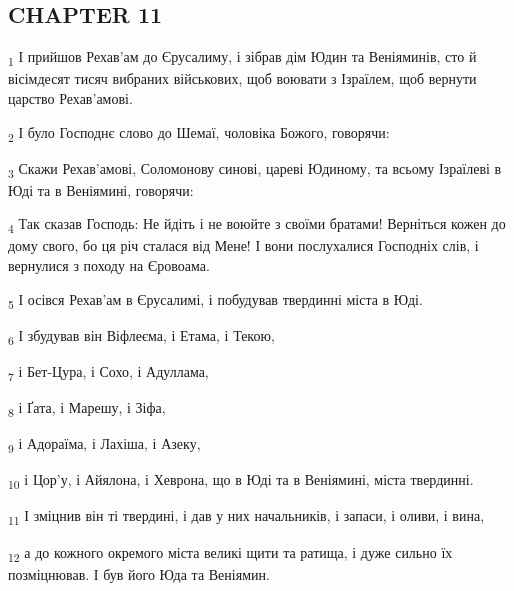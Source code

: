 \subsection{CHAPTER 11}
\begin{tcolorbox}
\textsubscript{1} І прийшов Рехав'ам до Єрусалиму, і зібрав дім Юдин та Веніяминів, сто й вісімдесят тисяч вибраних військових, щоб воювати з Ізраїлем, щоб вернути царство Рехав'амові.
\end{tcolorbox}
\begin{tcolorbox}
\textsubscript{2} І було Господнє слово до Шемаї, чоловіка Божого, говорячи:
\end{tcolorbox}
\begin{tcolorbox}
\textsubscript{3} Скажи Рехав'амові, Соломонову синові, цареві Юдиному, та всьому Ізраїлеві в Юді та в Веніямині, говорячи:
\end{tcolorbox}
\begin{tcolorbox}
\textsubscript{4} Так сказав Господь: Не йдіть і не воюйте з своїми братами! Верніться кожен до дому свого, бо ця річ сталася від Мене! І вони послухалися Господніх слів, і вернулися з походу на Єровоама.
\end{tcolorbox}
\begin{tcolorbox}
\textsubscript{5} І осівся Рехав'ам в Єрусалимі, і побудував твердинні міста в Юді.
\end{tcolorbox}
\begin{tcolorbox}
\textsubscript{6} І збудував він Віфлеєма, і Етама, і Текою,
\end{tcolorbox}
\begin{tcolorbox}
\textsubscript{7} і Бет-Цура, і Сохо, і Адуллама,
\end{tcolorbox}
\begin{tcolorbox}
\textsubscript{8} і Ґата, і Марешу, і Зіфа,
\end{tcolorbox}
\begin{tcolorbox}
\textsubscript{9} і Адораїма, і Лахіша, і Азеку,
\end{tcolorbox}
\begin{tcolorbox}
\textsubscript{10} і Цор'у, і Айялона, і Хеврона, що в Юді та в Веніямині, міста твердинні.
\end{tcolorbox}
\begin{tcolorbox}
\textsubscript{11} І зміцнив він ті твердині, і дав у них начальників, і запаси, і оливи, і вина,
\end{tcolorbox}
\begin{tcolorbox}
\textsubscript{12} а до кожного окремого міста великі щити та ратища, і дуже сильно їх позміцнював. І був його Юда та Веніямин.
\end{tcolorbox}
